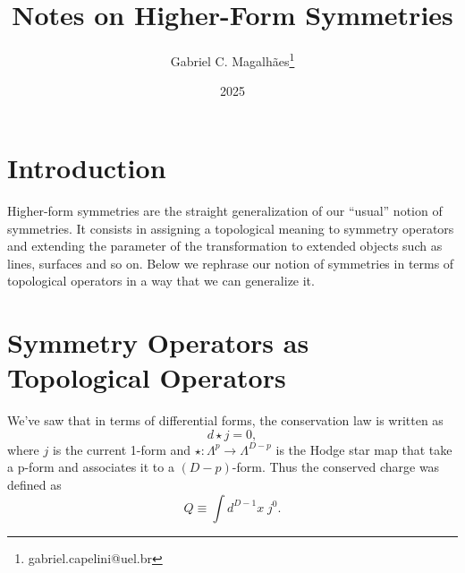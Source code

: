 \documentclass{article}
\title{Notes on Higher-Form Symmetries}
\author{Gabriel C. Magalhães\footnote{gabriel.capelini@uel.br}}
\date{2025}
\begin{document}
\maketitle

\section*{Introduction}
Higher-form symmetries are the straight generalization of our “usual” notion of symmetries. It consists in assigning a topological meaning to symmetry operators and extending the parameter of the transformation to extended objects such as lines, surfaces and so on. Below we rephrase our notion of symmetries in terms of topological operators in a way that we can generalize it. 

\section*{Symmetry Operators as Topological Operators}
We’ve saw that in terms of differential forms, the conservation law is written as
\begin{equation*}
	d\star j=0,
\end{equation*}
where $j$ is the current 1-form and $\star:\Lambda^p\to \Lambda^{D-p}$   is the Hodge star map that take a p-form and associates it to a $(D-p)$-form. Thus the conserved charge was defined as
\begin{equation*}
	Q\equiv\int d^{D-1}x\;j^0.
\end{equation*}
\end{document}
